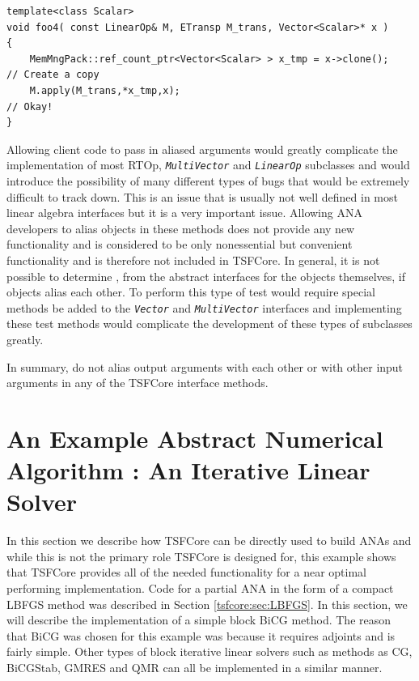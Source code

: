 \documentclass[10pt,fleqn]{article}
\begin{document}
{\scriptsize\begin{verbatim}
template<class Scalar>
void foo4( const LinearOp& M, ETransp M_trans, Vector<Scalar>* x )
{
    MemMngPack::ref_count_ptr<Vector<Scalar> > x_tmp = x->clone();   // Create a copy
    M.apply(M_trans,*x_tmp,x);                                       // Okay!
}
\end{verbatim}}

Allowing client code to pass in aliased arguments would greatly
complicate the implementation of most RTOp,
\texttt{\textit{MultiVector}} and \texttt{\textit{LinearOp}}
subclasses and would introduce the possibility of many different types
of bugs that would be extremely difficult to track down.  This is an
issue that is usually not well defined in most linear algebra
interfaces but it is a very important issue.  Allowing ANA developers
to alias objects in these methods does not provide any new
functionality and is considered to be only nonessential but convenient
functionality and is therefore not included in TSFCore.  In general,
it is not possible to determine , from the abstract interfaces for the
objects themselves, if objects alias each other.  To perform this type
of test would require special methods be added to the
\texttt{\textit{Vector}} and
\texttt{\textit{MultiVector}} interfaces and implementing these test
methods would complicate the development of these types of subclasses
greatly.

In summary, do not alias output arguments with each other or with
other input arguments in any of the TSFCore interface methods.

%
\section{An Example Abstract Numerical Algorithm : An Iterative Linear Solver}
\label{tsfcore:sec:ANA_iter_solver_example}
%

In this section we describe how TSFCore can be directly used to build
ANAs and while this is not the primary role TSFCore is designed for, this
example shows that TSFCore provides all of the needed functionality for a
near optimal performing implementation.  Code for a partial ANA in
the form of a compact LBFGS method was described in Section
\ref{tsfcore:sec:LBFGS}.  In this section, we will describe the
implementation of a simple block BiCG
\cite{ref:tmpls_for_iter_systems} method.  The reason that BiCG was
chosen for this example was because it requires adjoints and is fairly
simple.  Other types of block iterative linear solvers such as methods
as CG, BiCGStab, GMRES and QMR \cite{ref:tmpls_for_iter_systems} can
all be implemented in a similar manner.
\end{document}
